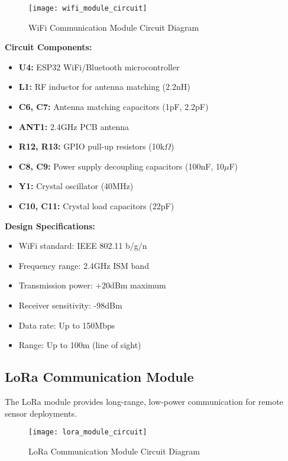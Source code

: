 \begin{figure}[H]
\centering
\texttt{[image: wifi\_module\_circuit]}
\caption{WiFi Communication Module Circuit Diagram}
\label{fig:wifi_module_circuit}
\end{figure}

\textbf{Circuit Components:}
\begin{itemize}
\item \textbf{U4:} ESP32 WiFi/Bluetooth microcontroller
\item \textbf{L1:} RF inductor for antenna matching (2.2nH)
\item \textbf{C6, C7:} Antenna matching capacitors (1pF, 2.2pF)
\item \textbf{ANT1:} 2.4GHz PCB antenna
\item \textbf{R12, R13:} GPIO pull-up resistors (10k$\Omega$)
\item \textbf{C8, C9:} Power supply decoupling capacitors (100nF, 10$\mu$F)
\item \textbf{Y1:} Crystal oscillator (40MHz)
\item \textbf{C10, C11:} Crystal load capacitors (22pF)
\end{itemize}

\textbf{Design Specifications:}
\begin{itemize}
\item WiFi standard: IEEE 802.11 b/g/n
\item Frequency range: 2.4GHz ISM band
\item Transmission power: +20dBm maximum
\item Receiver sensitivity: -98dBm
\item Data rate: Up to 150Mbps
\item Range: Up to 100m (line of sight)
\end{itemize}

\subsection{LoRa Communication Module}
\label{subsec:lora_module_circuit}

The LoRa module provides long-range, low-power communication for remote sensor deployments.

\begin{figure}[H]
\centering
\texttt{[image: lora\_module\_circuit]}
\caption{LoRa Communication Module Circuit Diagram}
\label{fig:lora_module_circuit}
\end{figure}

